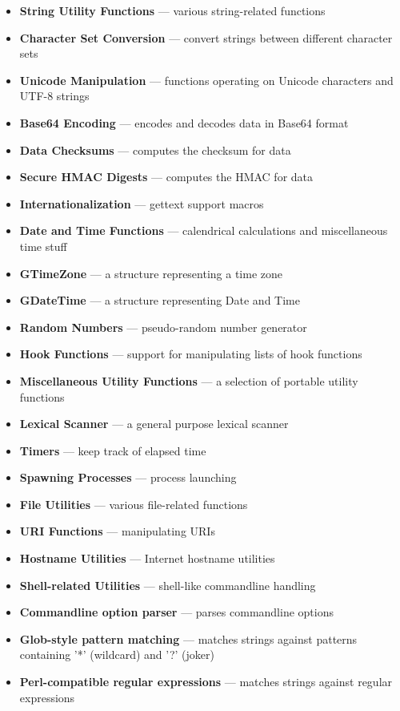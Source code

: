 \documentclass[12pt]{article}
\begin{document}
\begin{itemize}
\begin{itemize}
\item \textbf{String Utility Functions} — various string-related functions
\item \textbf{Character Set Conversion} — convert strings between different character sets
\item \textbf{Unicode Manipulation} — functions operating on Unicode characters and UTF-8 strings
\item \textbf{Base64 Encoding} — encodes and decodes data in Base64 format
\item \textbf{Data Checksums} — computes the checksum for data
\item \textbf{Secure HMAC Digests} — computes the HMAC for data
\item \textbf{Internationalization} — gettext support macros
\item \textbf{Date and Time Functions} — calendrical calculations and miscellaneous time stuff
\item \textbf{GTimeZone} — a structure representing a time zone
\item \textbf{GDateTime} — a structure representing Date and Time
\item \textbf{Random Numbers} — pseudo-random number generator
\item \textbf{Hook Functions} — support for manipulating lists of hook functions
\item \textbf{Miscellaneous Utility Functions} — a selection of portable utility functions
\item \textbf{Lexical Scanner} — a general purpose lexical scanner
\item \textbf{Timers} — keep track of elapsed time
\item \textbf{Spawning Processes} — process launching
\item \textbf{File Utilities} — various file-related functions
\item \textbf{URI Functions} — manipulating URIs
\item \textbf{Hostname Utilities} — Internet hostname utilities
\item \textbf{Shell-related Utilities} — shell-like commandline handling
\item \textbf{Commandline option parser} — parses commandline options
\item \textbf{Glob-style pattern matching} — matches strings against patterns containing '*' (wildcard) and '?' (joker)
\item \textbf{Perl-compatible regular expressions} — matches strings against regular expressions

\end{itemize}
\end{itemize}
\end{document}
